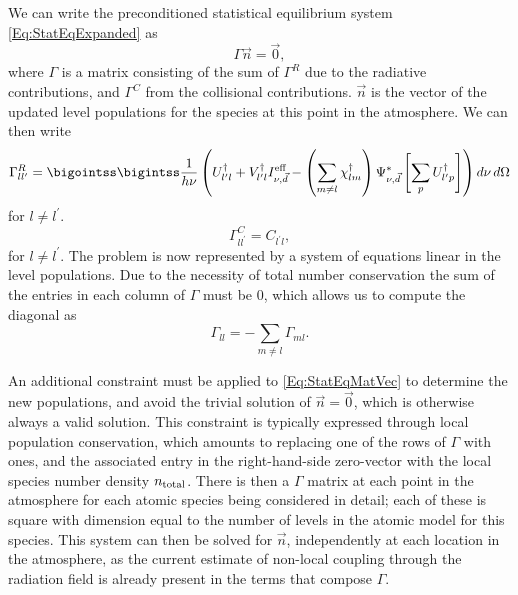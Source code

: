We can write the preconditioned statistical equilibrium system \eqref{Eq:StatEqExpanded} as
\begin{equation}
    \Gamma \vec{n} = \vec{0},
    \label{Eq:StatEqMatVec}
\end{equation}
where $\Gamma$ is a matrix consisting of the sum of $\Gamma^R$ due to the radiative contributions, and $\Gamma^C$ from the collisional contributions. $\vec{n}$ is the vector of the updated level populations for the species at this point in the atmosphere.
We can then write
\begin{equation}
    \Gamma^R_{ll^\prime} = \bigointss \bigintss \frac{1}{h\nu} \left( U^\dagger_{l^\prime l} + V^\dagger_{l^\prime l}I_{\nu, \vec{d}}^\textnormal{eff} - \left(\sum_{m\neq l}\chi^\dagger_{lm}\right) \Psi^*_{\nu, \vec{d}} \left[ \sum_p U^\dagger_{l^\prime p} \right] \right) \mathop{\dd{}\nu}\mathop{\dd{}\Omega}
    \label{Eq:GammaR}
\end{equation}
for $l\neq l^\prime$.
\begin{equation}
    \Gamma^C_{ll^\prime} = C_{l^\prime l},
\end{equation}
for $l\neq l^\prime$.
The problem is now represented by a system of equations linear in the level populations.
Due to the necessity of total number conservation the sum of the entries in each column of $\Gamma$ must be 0, which allows us to compute the diagonal  as
\begin{equation}
    \Gamma_{ll} = -\sum_{m\neq l} \Gamma_{ml}.
\end{equation}

An additional constraint must be applied to \eqref{Eq:StatEqMatVec} to determine the new populations, and avoid the trivial solution of $\vec{n} = \vec{0}$, which is otherwise always a valid solution.
This constraint is typically expressed through local population conservation, which amounts to replacing one of the rows of $\Gamma$ with ones, and the associated entry in the right-hand-side zero-vector with the local species number density $n_\textnormal{total}$.
There is then a $\Gamma$ matrix at each point in the atmosphere for each atomic species being considered in detail; each of these is square with dimension equal to the number of levels in the atomic model for this species.
This system can then be solved for $\vec{n}$, independently at each location in the atmosphere, as the current estimate of non-local coupling through the radiation field is already present in the terms that compose $\Gamma$.

